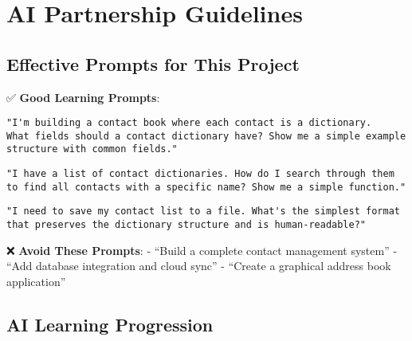 \documentclass[
  letterpaper,
  DIV=11,
  numbers=noendperiod,
  oneside]{scrreprt}
\begin{document}
\section{AI Partnership Guidelines}\label{ai-partnership-guidelines-5}

\subsection{Effective Prompts for This
Project}\label{effective-prompts-for-this-project-5}

✅ \textbf{Good Learning Prompts}:

\begin{verbatim}
"I'm building a contact book where each contact is a dictionary. 
What fields should a contact dictionary have? Show me a simple example 
structure with common fields."
\end{verbatim}

\begin{verbatim}
"I have a list of contact dictionaries. How do I search through them 
to find all contacts with a specific name? Show me a simple function."
\end{verbatim}

\begin{verbatim}
"I need to save my contact list to a file. What's the simplest format 
that preserves the dictionary structure and is human-readable?"
\end{verbatim}

❌ \textbf{Avoid These Prompts}: - ``Build a complete contact management
system'' - ``Add database integration and cloud sync'' - ``Create a
graphical address book application''

\subsection{AI Learning Progression}\label{ai-learning-progression-5}
\end{document}
